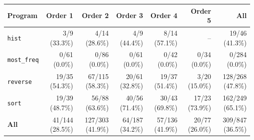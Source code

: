 \begin{tabular}{lrrrrrr}
\toprule
Program & Order 1 & Order 2 & Order 3 & Order 4 & Order 5 & All \\
\midrule
\texttt{hist} & 3/9 (33.3\%) & 4/14 (28.6\%) & 4/9 (44.4\%) & 8/14 (57.1\%) & -- & 19/46 (41.3\%) \\
\texttt{most\_freq} & 0/61 (0.0\%) & 0/86 (0.0\%) & 0/61 (0.0\%) & 0/42 (0.0\%) & 0/34 (0.0\%) & 0/284 (0.0\%) \\
\texttt{reverse} & 19/35 (54.3\%) & 67/115 (58.3\%) & 20/61 (32.8\%) & 19/37 (51.4\%) & 3/20 (15.0\%) & 128/268 (47.8\%) \\
\texttt{sort} & 19/39 (48.7\%) & 56/88 (63.6\%) & 40/56 (71.4\%) & 30/43 (69.8\%) & 17/23 (73.9\%) & 162/249 (65.1\%) \\
\midrule
\textbf{All} & 41/144 (28.5\%) & 127/303 (41.9\%) & 64/187 (34.2\%) & 57/136 (41.9\%) & 20/77 (26.0\%) & 309/847 (36.5\%) \\
\bottomrule
\end{tabular}
